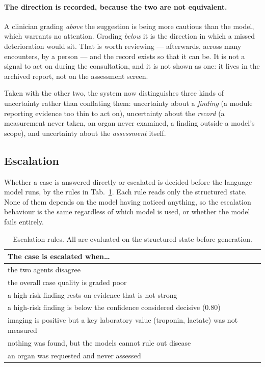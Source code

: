 \paragraph{The direction is recorded, because the two are not equivalent.} A clinician grading
\emph{above} the suggestion is being more cautious than the model, which warrants no attention.
Grading \emph{below} it is the direction in which a missed deterioration would sit. That is
worth reviewing --- afterwards, across many encounters, by a person --- and the record exists so
that it can be. It is not a signal to act on during the consultation, and it is not shown as
one: it lives in the archived report, not on the assessment screen.

Taken with the other two, the system now distinguishes three kinds of uncertainty rather than
conflating them: uncertainty about a \emph{finding} (a module reporting evidence too thin to
act on), uncertainty about the \emph{record} (a measurement never taken, an organ never
examined, a finding outside a model's scope), and uncertainty about the \emph{assessment}
itself.

\subsection{Escalation}
\label{subsec:reasoning-escalation}

Whether a case is answered directly or escalated is decided before the language model runs,
by the rules in Tab.~\ref{tab:escalation}. Each rule reads only the structured state. None
of them depends on the model having noticed anything, so the escalation behaviour is the
same regardless of which model is used, or whether the model fails entirely.

\begin{table}[H]
  \centering
  \small
  \begin{tabular}{p{10.5cm}}
    \toprule
    \textbf{The case is escalated when\ldots} \\
    \midrule
    the two agents disagree \\
    the overall case quality is graded poor \\
    a high-risk finding rests on evidence that is not strong \\
    a high-risk finding is below the confidence considered decisive (0.80) \\
    imaging is positive but a key laboratory value (troponin, lactate) was not measured \\
    nothing was found, but the models cannot rule out disease \\
    an organ was requested and never assessed \\
    \bottomrule
  \end{tabular}
  \caption{Escalation rules. All are evaluated on the structured state before generation.}
  \label{tab:escalation}
\end{table}

